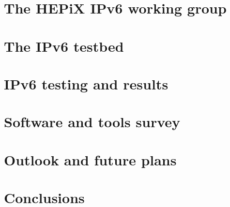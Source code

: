 \documentclass[a4paper]{jpconf}
\begin{document}
\section{The HEPiX IPv6 working group}


\section{The IPv6 testbed}


\section{IPv6 testing and results}


\section{Software and tools survey}
%

%

\section{Outlook and future plans}


\section{Conclusions}


\par

\end{document}
